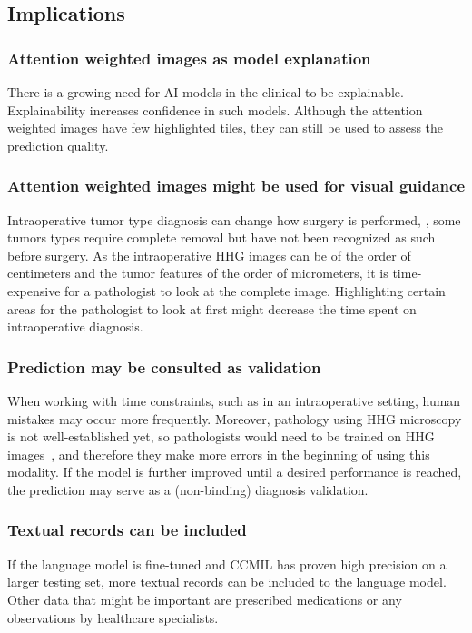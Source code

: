 \subsection{Implications}

\subsubsection{Attention weighted images as model explanation}
There is a growing need for AI models in the clinical to be explainable.
Explainability increases confidence in such models.
Although the attention weighted images have few highlighted tiles, they can still be used to assess the prediction quality.

\subsubsection{Attention weighted images might be used for visual guidance}
Intraoperative tumor type diagnosis can change how surgery is performed, \eg, some tumors types require complete removal but have not been recognized as such before surgery.
As the intraoperative HHG images can be of the order of centimeters and the tumor features of the order of micrometers, it is time-expensive for a pathologist to look at the complete image.
Highlighting certain areas for the pathologist to look at first might decrease the time spent on intraoperative diagnosis.

\subsubsection{Prediction may be consulted as validation}
When working with time constraints, such as in an intraoperative setting, human mistakes may occur more frequently.
Moreover, pathology using HHG microscopy is not well-established yet, so pathologists would need to be trained on HHG images~, and therefore they make more errors in the beginning of using this modality.
If the model is further improved until a desired performance is reached, the prediction may serve as a (non-binding) diagnosis validation.

\subsubsection{Textual records can be included}
If the language model is fine-tuned and CCMIL has proven high precision on a larger testing set, more textual records can be included to the language model.
Other data that might be important are \eg prescribed medications or any observations by healthcare specialists.
